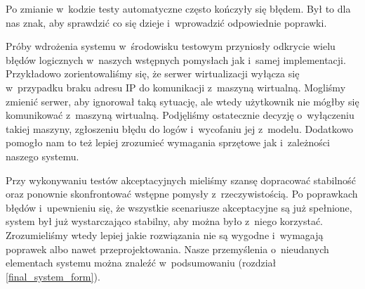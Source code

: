\documentclass[../analiza-rozwiazania.tex]{subfiles}
\begin{document}
Po zmianie w~kodzie testy automatyczne często kończyły się błędem.
Był to dla nas znak, aby sprawdzić co się dzieje i~wprowadzić odpowiednie poprawki.

Próby wdrożenia systemu w~środowisku testowym przyniosły odkrycie wielu błędów logicznych w~naszych wstępnych pomysłach jak i~samej implementacji.
Przykładowo zorientowaliśmy się, że serwer wirtualizacji wyłącza się w~przypadku braku adresu IP do komunikacji z~maszyną wirtualną.
Mogliśmy zmienić serwer, aby ignorował taką sytuację, ale wtedy użytkownik nie mógłby się komunikować z~maszyną wirtualną.
Podjęliśmy ostatecznie decyzję o~wyłączeniu takiej maszyny, zgłoszeniu błędu do logów i~wycofaniu jej z~modelu.
Dodatkowo pomogło nam to też lepiej zrozumieć wymagania sprzętowe jak i~zależności naszego systemu.

Przy wykonywaniu testów akceptacyjnych mieliśmy szansę dopracować stabilność oraz ponownie skonfrontować wstępne pomysły z~rzeczywistością.
Po poprawkach błędów i~upewnieniu się, że wszystkie scenariusze akceptacyjne są już spełnione, system był już wystarczająco stabilny, aby można było z~niego korzystać.
Zrozumieliśmy wtedy lepiej jakie rozwiązania nie są wygodne i~wymagają poprawek albo nawet przeprojektowania.
Nasze przemyślenia o~nieudanych elementach systemu można znaleźć w~podsumowaniu (rozdział \ref{final_system_form}).
\end{document}

